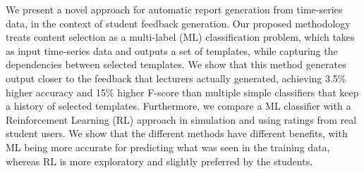 We present a novel approach for automatic report generation from time-series data, in the context of student feedback generation. Our proposed methodology treats content selection as a multi-label (ML) classification problem, which takes as input time-series data and outputs a set of templates, while capturing the dependencies between selected templates. We show that this method generates output closer to the feedback that lecturers actually generated, achieving 3.5\% higher accuracy and 15\% higher F-score than multiple simple classifiers that keep a history of selected templates. Furthermore, we compare a ML classifier with a Reinforcement Learning (RL) approach in simulation and using ratings from real student users. We show that the different methods have different benefits, with ML being more accurate for predicting what was seen in the training data, whereas RL is more exploratory and slightly preferred by the students.
